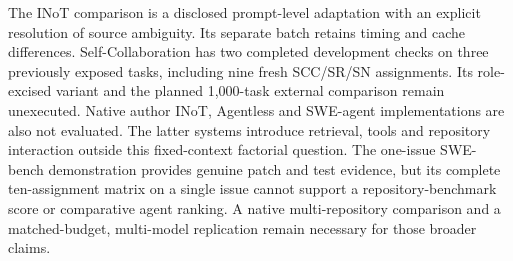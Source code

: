 The INoT comparison is a disclosed prompt-level adaptation with an explicit resolution of source ambiguity. Its separate batch retains timing and cache differences. Self-Collaboration has two completed development checks on three previously exposed tasks, including nine fresh SCC/SR/SN assignments. Its role-excised variant and the planned 1,000-task external comparison remain unexecuted. Native author INoT, Agentless and SWE-agent implementations are also not evaluated. The latter systems introduce retrieval, tools and repository interaction outside this fixed-context factorial question. The one-issue SWE-bench demonstration provides genuine patch and test evidence, but its complete ten-assignment matrix on a single issue cannot support a repository-benchmark score or comparative agent ranking. A native multi-repository comparison and a matched-budget, multi-model replication remain necessary for those broader claims.
